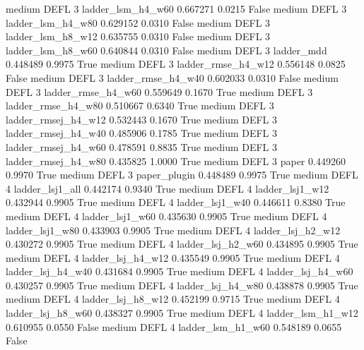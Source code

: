     medium     DEFL                 3   ladder_lsm_h4_w60   0.667271      0.0215   False
    medium     DEFL                 3   ladder_lsm_h4_w80   0.629152      0.0310   False
    medium     DEFL                 3   ladder_lsm_h8_w12   0.635755      0.0310   False
    medium     DEFL                 3   ladder_lsm_h8_w60   0.640844      0.0310   False
    medium     DEFL                 3          ladder_mdd   0.448489      0.9975    True
    medium     DEFL                 3  ladder_rmse_h4_w12   0.556148      0.0825   False
    medium     DEFL                 3  ladder_rmse_h4_w40   0.602033      0.0310   False
    medium     DEFL                 3  ladder_rmse_h4_w60   0.559649      0.1670    True
    medium     DEFL                 3  ladder_rmse_h4_w80   0.510667      0.6340    True
    medium     DEFL                 3 ladder_rmsej_h4_w12   0.532443      0.1670    True
    medium     DEFL                 3 ladder_rmsej_h4_w40   0.485906      0.1785    True
    medium     DEFL                 3 ladder_rmsej_h4_w60   0.478591      0.8835    True
    medium     DEFL                 3 ladder_rmsej_h4_w80   0.435825      1.0000    True
    medium     DEFL                 3               paper   0.449260      0.9970    True
    medium     DEFL                 3        paper_plugin   0.448489      0.9975    True
    medium     DEFL                 4     ladder_lsj1_all   0.442174      0.9340    True
    medium     DEFL                 4     ladder_lsj1_w12   0.432944      0.9905    True
    medium     DEFL                 4     ladder_lsj1_w40   0.446611      0.8380    True
    medium     DEFL                 4     ladder_lsj1_w60   0.435630      0.9905    True
    medium     DEFL                 4     ladder_lsj1_w80   0.433903      0.9905    True
    medium     DEFL                 4   ladder_lsj_h2_w12   0.430272      0.9905    True
    medium     DEFL                 4   ladder_lsj_h2_w60   0.434895      0.9905    True
    medium     DEFL                 4   ladder_lsj_h4_w12   0.435549      0.9905    True
    medium     DEFL                 4   ladder_lsj_h4_w40   0.431684      0.9905    True
    medium     DEFL                 4   ladder_lsj_h4_w60   0.430257      0.9905    True
    medium     DEFL                 4   ladder_lsj_h4_w80   0.438878      0.9905    True
    medium     DEFL                 4   ladder_lsj_h8_w12   0.452199      0.9715    True
    medium     DEFL                 4   ladder_lsj_h8_w60   0.438327      0.9905    True
    medium     DEFL                 4   ladder_lsm_h1_w12   0.610955      0.0550   False
    medium     DEFL                 4   ladder_lsm_h1_w60   0.548189      0.0655   False
